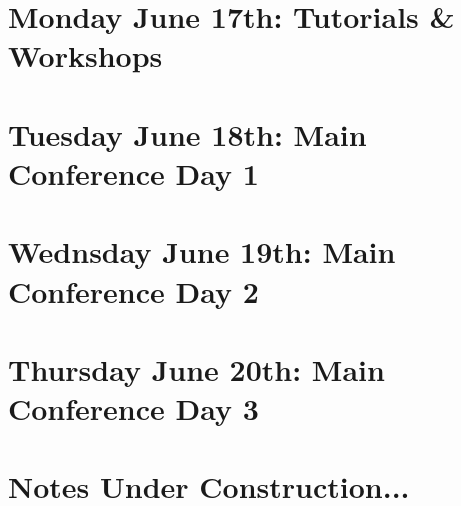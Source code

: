 \documentclass[11pt]{article}
\begin{document}
\newpage
\section{Monday June 17th: Tutorials \& Workshops}


\newpage
\section{Tuesday June 18th: Main Conference Day 1}


\newpage
\section{Wednsday June 19th: Main Conference Day 2}


\newpage
\section{Thursday June 20th: Main Conference Day 3}


\newpage
\section{Notes Under Construction...}

\end{document}
